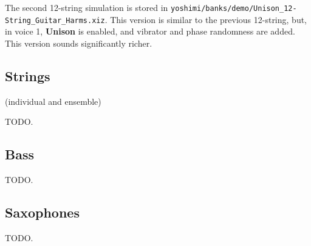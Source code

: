    The second 12-string simulation is stored in
   \texttt{yoshimi/banks/demo/Unison\_12-String\_Guitar\_Harms.xiz}.
   This version is similar to the previous 12-string, but, in voice 1,
   \textbf{Unison} is enabled, and vibrator and phase randomness are added.
   This version sounds significantly richer.

\subsection{Strings} (individual and ensemble)
\label{subsec:cookbook_instruments_strings}

   TODO.

\subsection{Bass}
\label{subsec:cookbook_instruments_bass}

   TODO.

\subsection{Saxophones}
\label{subsec:cookbook_instruments_saxophones}

   TODO.

